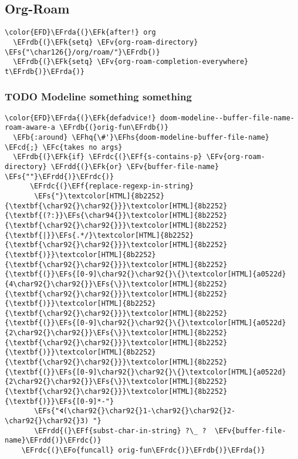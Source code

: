 \documentclass{article}
\newcommand{\EFc}[1]{\textcolor{EFc}{#1}} %
\newcommand{\EFcd}[1]{\textcolor{EFcd}{#1}} %
\newcommand{\EFs}[1]{\textcolor{EFs}{#1}} %
\newcommand{\EFk}[1]{\textcolor{EFk}{#1}} %
\newcommand{\EFb}[1]{\textcolor{EFb}{#1}} %
\newcommand{\EFf}[1]{\textcolor{EFf}{#1}} %
\newcommand{\EFv}[1]{\textcolor{EFv}{#1}} %
\newcommand{\EFo}[1]{\textcolor{EFo}{#1}} %
\newcommand{\EFhq}[1]{#1} %
\newcommand{\EFhs}[1]{\textcolor{EFhs}{#1}} %
\newcommand{\EFrda}[1]{\textcolor{EFrda}{#1}} %
\newcommand{\EFrdb}[1]{\textcolor{EFrdb}{#1}} %
\newcommand{\EFrdc}[1]{\textcolor{EFrdc}{#1}} %
\newcommand{\EFrdd}[1]{\textcolor{EFrdd}{#1}} %
\begin{document}
\subsection{Org-Roam}
\label{sec:orgda489d4}
\begin{Code}
\begin{Verbatim}
\color{EFD}\EFrda{(}\EFk{after!} org
  \EFrdb{(}\EFk{setq} \EFv{org-roam-directory}  \EFs{"\char126{}/org/roam/"}\EFrdb{)}
  \EFrdb{(}\EFk{setq} \EFv{org-roam-completion-everywhere} t\EFrdb{)}\EFrda{)}
\end{Verbatim}
\end{Code}

\subsubsection{{\bfseries\sffamily TODO} Modeline something something}
\label{sec:org7123256}
\begin{Code}
\begin{Verbatim}
\color{EFD}\EFrda{(}\EFk{defadvice!} doom-modeline--buffer-file-name-roam-aware-a \EFrdb{(}orig-fun\EFrdb{)}
  \EFb{:around} \EFhq{\#'}\EFhs{doom-modeline-buffer-file-name} \EFcd{;} \EFc{takes no args}
  \EFrdb{(}\EFk{if} \EFrdc{(}\EFf{s-contains-p} \EFv{org-roam-directory} \EFrdd{(}\EFk{or} \EFv{buffer-file-name} \EFs{""}\EFrdd{)}\EFrdc{)}
      \EFrdc{(}\EFf{replace-regexp-in-string}
       \EFs{"}\textcolor[HTML]{8b2252}{\textbf{\char92{}\char92{}}}\textcolor[HTML]{8b2252}{\textbf{(?:}}\EFs{\char94{}}\textcolor[HTML]{8b2252}{\textbf{\char92{}\char92{}}}\textcolor[HTML]{8b2252}{\textbf{|}}\EFs{.*/}\textcolor[HTML]{8b2252}{\textbf{\char92{}\char92{}}}\textcolor[HTML]{8b2252}{\textbf{)}}\textcolor[HTML]{8b2252}{\textbf{\char92{}\char92{}}}\textcolor[HTML]{8b2252}{\textbf{(}}\EFs{[0-9]\char92{}\char92{}\{}\textcolor[HTML]{a0522d}{4\char92{}\char92{}}\EFs{\}}\textcolor[HTML]{8b2252}{\textbf{\char92{}\char92{}}}\textcolor[HTML]{8b2252}{\textbf{)}}\textcolor[HTML]{8b2252}{\textbf{\char92{}\char92{}}}\textcolor[HTML]{8b2252}{\textbf{(}}\EFs{[0-9]\char92{}\char92{}\{}\textcolor[HTML]{a0522d}{2\char92{}\char92{}}\EFs{\}}\textcolor[HTML]{8b2252}{\textbf{\char92{}\char92{}}}\textcolor[HTML]{8b2252}{\textbf{)}}\textcolor[HTML]{8b2252}{\textbf{\char92{}\char92{}}}\textcolor[HTML]{8b2252}{\textbf{(}}\EFs{[0-9]\char92{}\char92{}\{}\textcolor[HTML]{a0522d}{2\char92{}\char92{}}\EFs{\}}\textcolor[HTML]{8b2252}{\textbf{\char92{}\char92{}}}\textcolor[HTML]{8b2252}{\textbf{)}}\EFs{[0-9]*-"}
       \EFs{"🢔(\char92{}\char92{}1-\char92{}\char92{}2-\char92{}\char92{}3) "}
       \EFrdd{(}\EFf{subst-char-in-string} ?\_ ?  \EFv{buffer-file-name}\EFrdd{)}\EFrdc{)}
    \EFrdc{(}\EFo{funcall} orig-fun\EFrdc{)}\EFrdb{)}\EFrda{)}
\end{Verbatim}
\end{Code}
\end{document}
